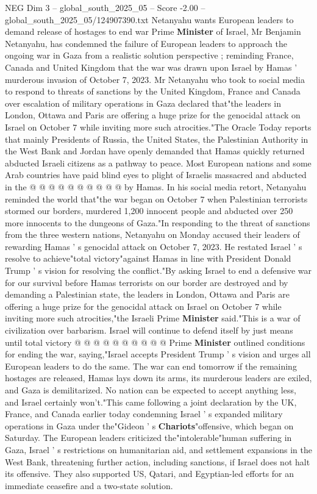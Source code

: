 \begin{textsample}{NEG Dim 3 – global\_south\_2025\_05 – Score -2.00 – global\_south\_2025\_05/124907390.txt}  \label{ex:f3_neg_178}
Netanyahu wants European leaders to demand release of hostages to end war Prime \textbf{Minister} of Israel, Mr Benjamin Netanyahu, has condemned the failure of European leaders to approach the ongoing war in Gaza from a realistic solution perspective ; reminding France, Canada and United Kingdom that the war was drawn upon Israel by Hamas ' murderous invasion of October 7, 2023.
Mr Netanyahu who took to social media to respond to threats of sanctions by the United Kingdom, France and Canada over escalation of military operations in Gaza declared that"the leaders in London, Ottawa and Paris are offering a huge prize for the genocidal attack on Israel on October 7 while inviting more such atrocities."The Oracle Today reports that mainly Presidents of Russia, the United States, the Palestinian Authority in the West Bank and Jordan have openly demanded that Hamas quickly returned abducted Israeli citizens as a pathway to peace.
Most European nations and some Arab countries have paid blind eyes to plight of Israelis massacred and abducted in the @ @ @ @ @ @ @ @ @ @ by Hamas.
In his social media retort, Netanyahu reminded the world that"the war began on October 7 when Palestinian terrorists stormed our borders, murdered 1,200 innocent people and abducted over 250 more innocents to the dungeons of Gaza."In responding to the threat of sanctions from the three western nations, Netanyahu on Monday accused their leaders of rewarding Hamas ' s genocidal attack on October 7, 2023.
He restated Israel ' s resolve to achieve"total victory"against Hamas in line with President Donald Trump ' s vision for resolving the conflict."By asking Israel to end a defensive war for our survival before Hamas terrorists on our border are destroyed and by demanding a Palestinian state, the leaders in London, Ottawa and Paris are offering a huge prize for the genocidal attack on Israel on October 7 while inviting more such atrocities,"the Israeli Prime \textbf{Minister} said."This is a war of civilization over barbarism.
Israel will continue to defend itself by just means until total victory @ @ @ @ @ @ @ @ @ @ Prime \textbf{Minister} outlined conditions for ending the war, saying,"Israel accepts President Trump ' s vision and urges all European leaders to do the same.
The war can end tomorrow if the remaining hostages are released, Hamas lays down its arms, its murderous leaders are exiled, and Gaza is demilitarized.
No nation can be expected to accept anything less, and Israel certainly won't."This came following a joint declaration by the UK, France, and Canada earlier today condemning Israel ' s expanded military operations in Gaza under the"Gideon ' s \textbf{Chariots}"offensive, which began on Saturday.
The European leaders criticized the"intolerable"human suffering in Gaza, Israel ' s restrictions on humanitarian aid, and settlement expansions in the West Bank, threatening further action, including sanctions, if Israel does not halt its offensive.
They also supported US, Qatari, and Egyptian-led efforts for an immediate ceasefire and a two-state solution.

\end{textsample}
